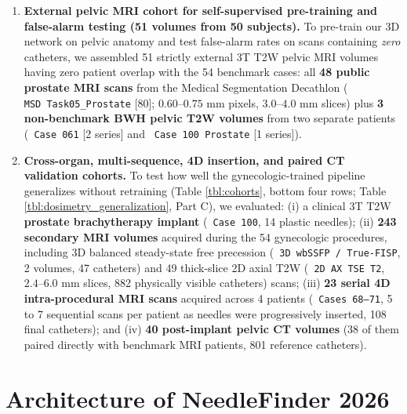 \documentclass[
  11pt,
]{article}
\let\nforigtexttt\texttt
\renewcommand{\texttt}[1]{\nforigtexttt{\XeTeXinterchartokenstate=1 #1}}
\begin{document}
\begin{enumerate}
  trajectories, of which 460 are long shafts). Across these 40 scans,
  424 long-shaft pairs (and 476 all-catheter pairs) match one-to-one
  within \(3.5\text{ mm}\) between the two human teams, while their
  de-duplicated union contains 759 distinct trajectories (\(723\) from
  Team 1 plus \(36\) additional catheters traced only by Team 2).
\item
  \textbf{External pelvic MRI cohort for self-supervised pre-training
  and false-alarm testing (51 volumes from 50 subjects).} To pre-train
  our 3D network on pelvic anatomy and test false-alarm rates on scans
  containing \emph{zero} catheters, we assembled 51 strictly external 3T
  T2W pelvic MRI volumes having zero patient overlap with the 54
  benchmark cases: all \textbf{48 public prostate MRI scans} from the
  Medical Segmentation Decathlon (\texttt{MSD\ Task05\_Prostate}
  {[}80{]}; \(0.60\text{--}0.75\text{ mm}\) pixels,
  \(3.0\text{--}4.0\text{ mm}\) slices) plus \textbf{3 non-benchmark BWH
  pelvic T2W volumes} from two separate patients (\texttt{Case\ 061}
  {[}2 series{]} and \texttt{Case\ 100\ Prostate} {[}1 series{]}).
\item
  \textbf{Cross-organ, multi-sequence, 4D insertion, and paired CT
  validation cohorts.} To test how well the gynecologic-trained pipeline
  generalizes without retraining (Table \ref{tbl:cohorts}, bottom four
  rows; Table \ref{tbl:dosimetry_generalization}, Part C), we evaluated:
  (i) a clinical 3T T2W \textbf{prostate brachytherapy implant}
  (\texttt{Case\ 100}, 14 plastic needles); (ii) \textbf{243 secondary
  MRI volumes} acquired during the 54 gynecologic procedures, including
  3D balanced steady-state free precession
  (\texttt{3D\ wbSSFP\ /\ True-FISP}, 2 volumes, 47 catheters) and 49
  thick-slice 2D axial T2W (\texttt{2D\ AX\ TSE\ T2},
  \(2.4\text{--}6.0\text{ mm}\) slices, 882 physically visible
  catheters) scans; (iii) \textbf{23 serial 4D intra-procedural MRI
  scans} acquired across 4 patients (\texttt{Cases\ 68–71}, 5 to 7
  sequential scans per patient as needles were progressively inserted,
  108 final catheters); and (iv) \textbf{40 post-implant pelvic CT
  volumes} (38 of them paired directly with benchmark MRI patients, 801
  reference catheters).
\end{enumerate}

\FloatBarrier

\section{Architecture of NeedleFinder
2026}\label{architecture-of-needlefinder-2026}
\end{document}
